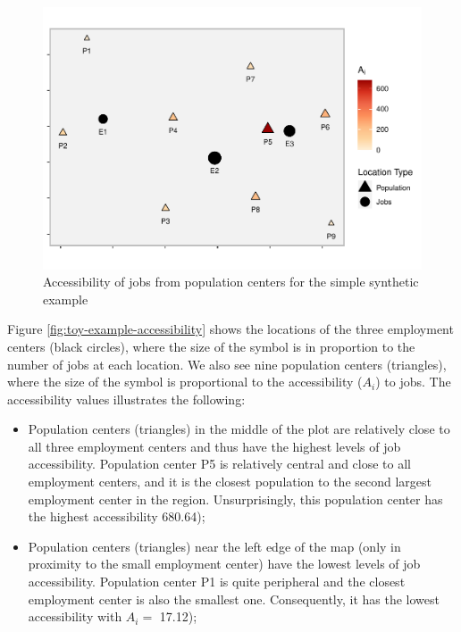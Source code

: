\documentclass[]{elsarticle} %
\begin{document}
\begin{figure}
\includegraphics[width=1\linewidth]{Spatial-Availability_files/figure-latex/toy-example-accessibility-plot-1} \caption{\label{fig:toy-example-accessibility}Accessibility of jobs from population centers for the simple synthetic example}\label{fig:toy-example-accessibility-plot}
\end{figure}

Figure \ref{fig:toy-example-accessibility} shows the locations of the
three employment centers (black circles), where the size of the symbol
is in proportion to the number of jobs at each location. We also see
nine population centers (triangles), where the size of the symbol is
proportional to the accessibility (\(A_i\)) to jobs. The accessibility
values illustrates the following:

\begin{itemize}
\item
  Population centers (triangles) in the middle of the plot are
  relatively close to all three employment centers and thus have the
  highest levels of job accessibility. Population center P5 is
  relatively central and close to all employment centers, and it is the
  closest population to the second largest employment center in the
  region. Unsurprisingly, this population center has the highest
  accessibility 680.64);
\item
  Population centers (triangles) near the left edge of the map (only in
  proximity to the small employment center) have the lowest levels of
  job accessibility. Population center P1 is quite peripheral and the
  closest employment center is also the smallest one. Consequently, it
  has the lowest accessibility with \(A_i=\) 17.12);
\end{itemize}
\end{document}
